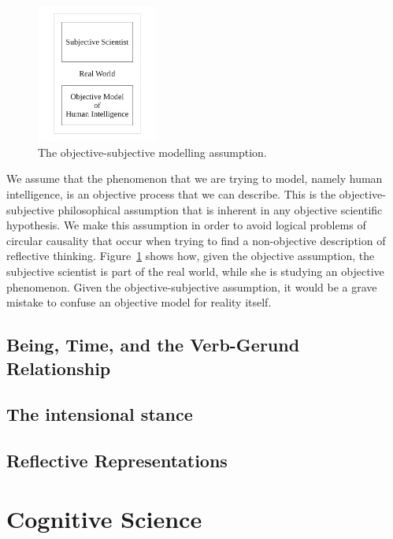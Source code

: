 \begin{figure}[bth]
  \center
  \includegraphics[width=4cm]{gfx/objective_description}
  \caption[The objective-subjective modelling assumption]{The objective-subjective modelling assumption.}
  \label{fig:objective_description}
\end{figure}

We assume that the phenomenon that we are trying to model, namely
human intelligence, is an objective process that we can describe.
This is the objective-subjective philosophical assumption that is
inherent in any objective scientific hypothesis.  We make this
assumption in order to avoid logical problems of circular causality
that occur when trying to find a non-objective description of
reflective thinking.  Figure~\ref{fig:objective_description} shows
how, given the objective assumption, the subjective scientist is part
of the real world, while she is studying an objective phenomenon.
Given the objective-subjective assumption, it would be a grave mistake
to confuse an objective model for reality itself.

\subsection{Being, Time, and the Verb-Gerund Relationship}

\subsection{The intensional stance}

\subsection{Reflective Representations}

\citep{perner:1991}


\section{Cognitive Science}


